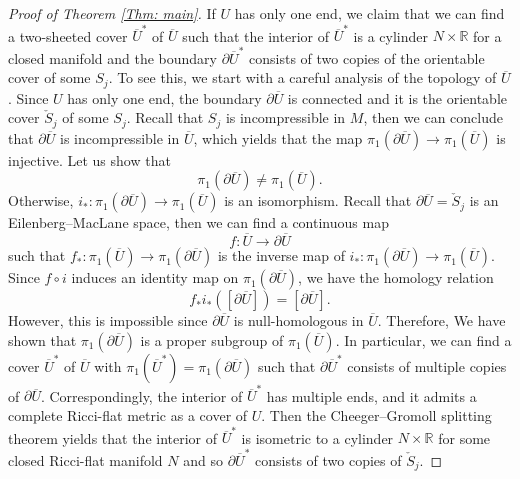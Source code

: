 \documentclass[11pt, reqno]{amsart}
\numberwithin{equation}{section}
\theoremstyle{definition}
\begin{document}
\begin{proof}[Proof of Theorem \ref{Thm: main}]
If $U$ has only one end, we claim that we can find a two-sheeted cover $\overline U^*$ of $\overline U$ such that the interior of $\overline U^*$ is a cylinder $N\times \mathbb R$ for a closed manifold and the boundary $\partial\overline U^*$ consists of two copies of the orientable cover of some $S_j$. To see this, we start with a careful analysis of the topology of $\overline U$. Since $U$ has only one end,
the boundary $\partial \overline U$ is connected and it is the orientable cover $\check S_j$ of some $S_j$. Recall that $S_j$ is incompressible in $M$, then we can conclude that $\partial \overline U$ is incompressible in $\overline U$, which yields that the map
$\pi_1(\partial \overline U) \to \pi_1(\overline{U})$
is injective. Let us show that $$\pi_1(\partial \overline U) \neq \pi_1(\overline{U}).$$ Otherwise, $i_*:\pi_1(\partial \overline U)\to \pi_1(\overline U)$ is an isomorphism. Recall that $\partial \overline U=\check S_j$ is an Eilenberg--MacLane space, then we can find a continuous map
$$f: \overline U \to \partial \overline U$$ such that $f_*:\pi_1(\overline U)\to \pi_1(\partial \overline U)$ is the inverse map of $i_*:\pi_1(\partial \overline U)\to \pi_1(\overline U)$. Since $f\circ i$ induces an identity map on $\pi_1(\partial \overline U)$, we have the homology relation
$$f_*i_*([\partial\overline U])=[\partial \overline U].$$
However, this is impossible since $\partial \overline U$ is null-homologous in $\overline U$. Therefore, We have shown that $\pi_1(\partial \overline U)$ is a proper subgroup of $\pi_1(\overline U)$. In particular, we can find a cover $\overline U^*$ of $\overline U$ with $\pi_1(\overline U^*)=\pi_1(\partial \overline U)$ such that $\partial \overline U^*$ consists of multiple copies of $\partial \overline U$. Correspondingly, the interior of $\overline U^*$ has multiple ends, and it admits a complete Ricci-flat metric as a cover of $U$. Then the Cheeger--Gromoll splitting theorem yields that the interior of $\overline U^*$ is isometric to a cylinder $N\times \mathbb R$ for some closed Ricci-flat manifold $N$ and so $\partial \overline U^*$ consists of two copies of $\check S_j$.




\end{proof}
\end{document}
